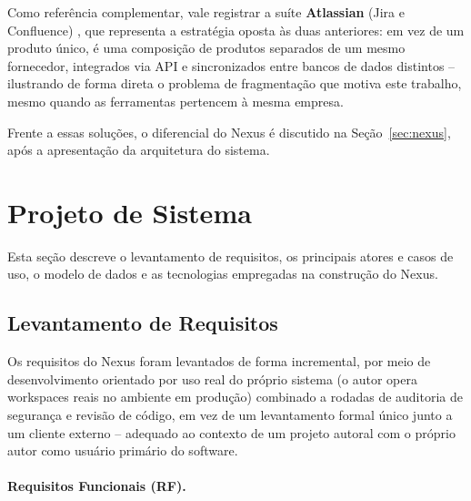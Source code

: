\documentclass[12pt]{article}
\begin{document}
Como referência complementar, vale registrar a suíte \textbf{Atlassian} (Jira e Confluence) \cite{atlassian}, que representa a estratégia oposta às duas anteriores: em vez de um produto único, é uma composição de produtos separados de um mesmo fornecedor, integrados via API e sincronizados entre bancos de dados distintos -- ilustrando de forma direta o problema de fragmentação que motiva este trabalho, mesmo quando as ferramentas pertencem à mesma empresa.

Frente a essas soluções, o diferencial do Nexus é discutido na Seção~\ref{sec:nexus}, após a apresentação da arquitetura do sistema.

\section{Projeto de Sistema}

Esta seção descreve o levantamento de requisitos, os principais atores e casos de uso, o modelo de dados e as tecnologias empregadas na construção do Nexus.

\subsection{Levantamento de Requisitos}

Os requisitos do Nexus foram levantados de forma incremental, por meio de desenvolvimento orientado por uso real do próprio sistema (o autor opera workspaces reais no ambiente em produção) combinado a rodadas de auditoria de segurança e revisão de código, em vez de um levantamento formal único junto a um cliente externo -- adequado ao contexto de um projeto autoral com o próprio autor como usuário primário do software.

\paragraph{Requisitos Funcionais (RF).}
\end{document}
